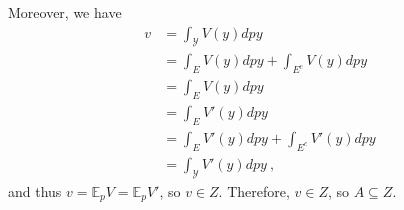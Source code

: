 \documentclass{article}
\newcommand{\Comments}{1}
\newcommand{\mynote}[2]{\ifnum\Comments=1\textcolor{#1}{#2}\fi}
\newcommand{\jessie}[1]{\mynote{purple}{[JF: #1]}}
\newcommand{\E}{\mathbb{E}}
\newcommand{\Y}{\mathcal{Y}}
\begin{document}
Moreover, we have
\begin{align*}
v &= \int_\Y V(y) dpy \\
&= \int_{E} V(y) dpy + \int_{E^c} V(y) dpy\\
&= \int_{E} V(y) dpy\\
&= \int_{E} V'(y) dpy\\
&= \int_{E} V'(y) dpy + \int_{E^c} V'(y) dpy \\
&= \int_\Y V'(y) dpy~,~
\end{align*}
and thus $v = \E_p V = \E_p V'$, so $v \in Z$.
Therefore, $v \in Z$, so $A \subseteq Z$.



\end{document}
